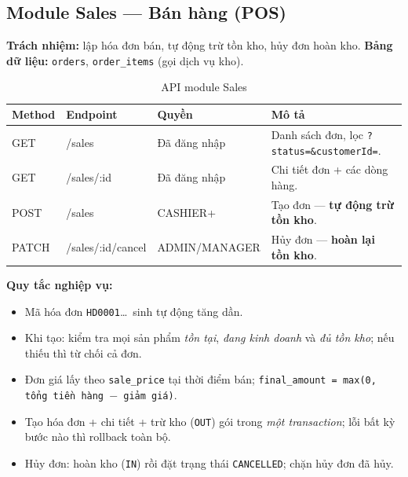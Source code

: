 \documentclass[12pt,a4paper]{report}
\begin{document}
\subsection{Module Sales --- Bán hàng (POS)}
\textbf{Trách nhiệm:} lập hóa đơn bán, tự động trừ tồn kho, hủy đơn hoàn kho. \textbf{Bảng dữ liệu:} \texttt{orders}, \texttt{order\_items} (gọi dịch vụ kho).
\begin{table}[H]\centering\small
\begin{tabularx}{\textwidth}{|L{1.5cm}|L{3.6cm}|L{3.4cm}|X|}
\hline
\textbf{Method} & \textbf{Endpoint} & \textbf{Quyền} & \textbf{Mô tả} \\ \hline
GET & /sales & Đã đăng nhập & Danh sách đơn, lọc \texttt{?status=\&customerId=}. \\ \hline
GET & /sales/:id & Đã đăng nhập & Chi tiết đơn + các dòng hàng. \\ \hline
POST & /sales & CASHIER+ & Tạo đơn --- \textbf{tự động trừ tồn kho}. \\ \hline
PATCH & /sales/:id/cancel & ADMIN/MANAGER & Hủy đơn --- \textbf{hoàn lại tồn kho}. \\ \hline
\end{tabularx}
\caption{API module Sales}
\end{table}
\textbf{Quy tắc nghiệp vụ:}
\begin{itemize}[leftmargin=1.4cm,nosep]
  \item Mã hóa đơn \texttt{HD0001}\ldots\ sinh tự động tăng dần.
  \item Khi tạo: kiểm tra mọi sản phẩm \emph{tồn tại}, \emph{đang kinh doanh} và \emph{đủ tồn kho}; nếu thiếu thì từ chối cả đơn.
  \item Đơn giá lấy theo \texttt{sale\_price} tại thời điểm bán; \texttt{final\_amount = max(0, tổng tiền hàng $-$ giảm giá)}.
  \item Tạo hóa đơn + chi tiết + trừ kho (\texttt{OUT}) gói trong \emph{một transaction}; lỗi bất kỳ bước nào thì rollback toàn bộ.
  \item Hủy đơn: hoàn kho (\texttt{IN}) rồi đặt trạng thái \texttt{CANCELLED}; chặn hủy đơn đã hủy.
\end{itemize}
\end{document}
